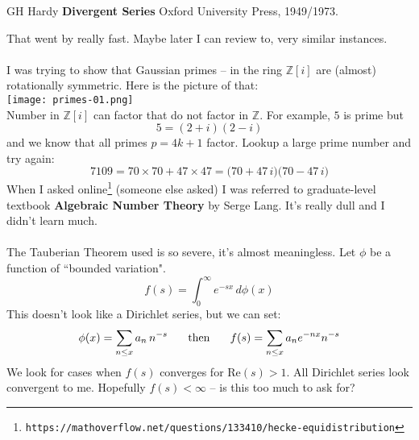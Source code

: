 \documentclass[12pt]{article}
\begin{document}
\begin{thebibliography}{}

\item GH Hardy \textbf{Divergent Series}  Oxford University Press, 1949/1973.

\end{thebibliography}

\newpage

\noindent That went by really fast.  Maybe later I can review to, very similar instances.  \\ \\
I was trying to show that Gaussian primes -- in the ring $\mathbb{Z}[i]$ are (almost) rotationally symmetric.  Here is the picture of that: \\
\texttt{[image: primes-01.png]} \\
Number in $\mathbb{Z}[i]$ can factor that do not factor in $\mathbb{Z}$.  For example, $5$ is prime but
$$  5 = (2+i)(2-i)$$
and we know that all primes $p = 4k+1$ factor.  Lookup a large prime number and try again:
$$ 7109 = 70 \times 70 + 47 \times 47 = \big( 70 + 47\,i \big)\big( 70 - 47\,i \big) $$
When I asked online\footnote{\texttt{https://mathoverflow.net/questions/133410/hecke-equidistribution}} (someone else asked) I was referred to graduate-level textbook \textbf{Algebraic Number Theory} by Serge Lang.  It's really dull and I didn't learn much. \\ \\
The Tauberian Theorem used is so severe, it's almost meaningless. Let $\phi$ be a function of ``bounded variation".
$$ f(s) = \int_0^\infty e^{-sx} \, d\phi(x) $$
This doesn't look like a Dirichlet series, but we can set:
$$ \phi(x) =  \sum_{n \leq x} a_n \, n^{-s} \hspace{0.25in}\text{then}\hspace{0.25in} f(s) = \sum_{n \leq x} a_n e^{-nx} n^{-s} $$
We look for cases when $f(s)$ converges for $\mathrm{Re}(s) > 1$.  All Dirichlet series look convergent to me.  Hopefully $f(s) < \infty$ -- is this too much to ask for?

\newpage
\end{document}
